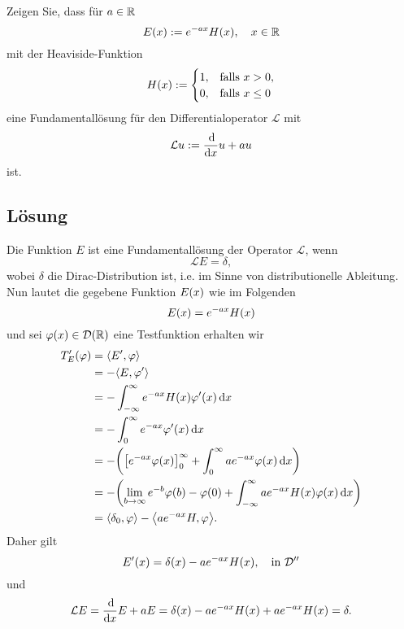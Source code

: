 \documentclass{exercise}
\begin{document}
    \begin{problem}
        Zeigen Sie, dass für \(a \in \mathbb{R}\)
        \[
            E\parentheses*{x} := e^{-ax}H\parentheses*{x}, \quad x \in \R
        \]
        mit der Heaviside-Funktion
        \[
            H\parentheses*{x} := \begin{cases}
                1, & \text{falls }x > 0,\\
                0, & \text{falls }x \le 0
            \end{cases}
        \]
        eine Fundamentallösung für den Differentialoperator \(\mathcal{L}\) mit
        \[
            \mathcal{L}u := \frac{\mathop{\mathrm{d}\!}}{\mathop{\mathrm{d}\!} x}u + au
        \]
        ist.
    \end{problem}
    
    \subsection*{Lösung}
    Die Funktion \(E\) ist eine Fundamentallösung der Operator \(\mathcal{L}\), wenn
    \[
        \mathcal{L}E = \delta,
    \]
    wobei \(\delta\) die Dirac-Distribution ist, i.e. im Sinne von distributionelle Ableitung.
    Nun lautet die gegebene Funktion \(E\parentheses*{x}\) wie im Folgenden
    \[
        E\parentheses*{x} = e^{-ax}H\parentheses*{x}
    \]
    und sei \(\varphi\parentheses*{x} \in \mathcal{D}\parentheses*{\R}\) eine Testfunktion erhalten wir
    \begin{align*}
        T_E'\parentheses*{\varphi} &= \angles*{E', \varphi}\\
        &= -\angles*{E, \varphi'}\\
        &= -\int_{-\infty}^\infty e^{-ax}H\parentheses*{x}\varphi'\parentheses*{x}\d x\\
        &= -\int_0^\infty e^{-ax}\varphi'\parentheses*{x}\d x\\
        &= -\parentheses*{\brackets*{e^{-ax}\varphi\parentheses*{x}}_0^\infty + \int_0^\infty ae^{-ax}\varphi\parentheses*{x}\d x}\\
        &= -\parentheses*{\lim_{b \to \infty}e^{-b}\varphi\parentheses*{b} - \varphi\parentheses*{0} + \int_{-\infty}^\infty ae^{-ax}H\parentheses*{x}\varphi\parentheses*{x}\d x}\\
        &= \angles*{\delta_0, \varphi} - \angles*{ae^{-ax}H, \varphi}.
    \end{align*}
    Daher gilt
    \[
        E'\parentheses*{x} = \delta\parentheses*{x} - ae^{-ax}H\parentheses*{x}, \quad \text{in }\mathcal{D}''
    \]
    und
    \[
        \mathcal{L}E = \frac{\d}{\d x}E + aE = \delta\parentheses*{x} - ae^{-ax}H\parentheses*{x} + ae^{-ax}H\parentheses*{x} = \delta.
    \]
\end{document}

